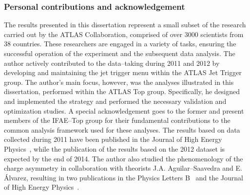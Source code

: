 \subsubsection*{Personal contributions and acknowledgement}

The results presented in this dissertation represent a small subset of
the research carried out by the ATLAS Collaboration, comprised of over
3000 scientists from 38 countries. These researchers are engaged in a
variety of tasks, ensuring the successful operation of the experiment and
the subsequent data analysis. The author actively contributed to the
data--taking during 2011 and 2012 by developing and maintaining the
jet trigger menu within the ATLAS Jet Trigger group. 
The author's main focus, however, was the analyses illustrated in this
dissertation, performed within the ATLAS Top group. Specifically, he
designed and implemented the strategy and performed the necessary
validation and optimization studies.
A special acknowledgement goes to the former and present members of
the IFAE--Top group for their fundamental contributions to the common
analysis framework used for these analyses.
The results based on data collected during 2011 have been published in
the Journal of High Energy Physics~\cite{Aad:2013cea}, while the
publication of the results based on the 2012 dataset is expected by
the end of 2014.
The author also studied the phenomenology of the \ttbar{} charge
asymmetry in collaboration with theorists J.A. Aguilar--Saavedra and
E. \'Alvarez, resulting in two publications in the Physics Letters
B~\cite{AguilarSaavedra:2011cp} and the Journal of High Energy
Physics~\cite{Aguilar-Saavedra:2014vta}.

